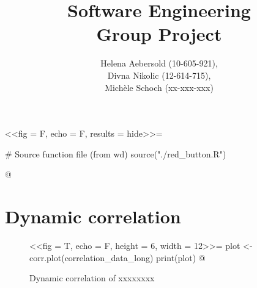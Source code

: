\documentclass[11pt,a4paper]{report}
\begin{document}
\title{\textbf{Software Engineering} \\ \vspace{40pt} Group Project}
\author{Helena Aebersold (10-605-921), \\ Divna Nikolic (12-614-715), \\ Michèle Schoch (xx-xxx-xxx)}
\maketitle


<<fig = F, echo = F, results = hide>>=

# Source function file (from wd)
source("./red_button.R")

@



\newpage
\section*{Dynamic correlation}

\begin{figure}[H]
\caption{Dynamic correlation of xxxxxxxx}
\label{dyn_corr}
\centering
<<fig = T, echo = F, height = 6, width = 12>>=
plot <- corr.plot(correlation_data_long)
print(plot)
@
\end{figure}
\end{document}
